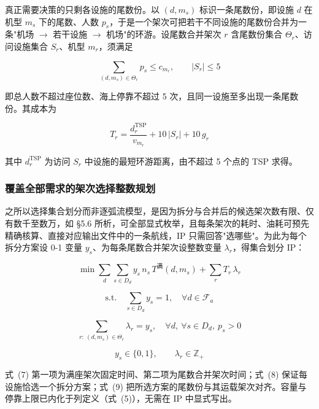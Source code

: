 \documentclass[zihao=-4,a4paper]{ctexart}
\begin{document}
真正需要决策的只剩各设施的尾数份。以 $(d,m_s)$ 标识一条尾数份，即设施 $d$ 在机型 $m_s$ 下的尾数、人数 $p_s$，于是一个架次可把若干不同设施的尾数份合并为一条"机场 $\to$ 若干设施 $\to$ 机场"的环游。设尾数合并架次 $r$ 含尾数份集合 $\Theta_r$、访问设施集合 $S_r$、机型 $m_r$，须满足

\begin{equation}
  \sum_{(d,m_s)\in\Theta_r} p_s \le c_{m_r},\qquad |S_r|\le 5
\end{equation}

即总人数不超过座位数、海上停靠不超过 5 次，且同一设施至多出现一条尾数份。其成本为

\begin{equation}
  T_r=\frac{d_r^{\text{TSP}}}{v_{m_r}}+10\,|S_r|+10\,g_r
\end{equation}

其中 $d_r^{\text{TSP}}$ 为访问 $S_r$ 中设施的最短环游距离，由不超过 5 个点的 TSP 求得。

\subsubsection{覆盖全部需求的架次选择整数规划}

之所以选择集合划分而非逐弧流模型，是因为拆分与合并后的候选架次数有限、仅有数千至数万，如 §5.6 所析，可全部显式枚举，且每条架次的耗时、油耗可预先精确核算、直接对应输出文件中的一条航线，IP 只需回答"选哪些"。为此为每个拆分方案设 0-1 变量 $y_s$、为每条尾数合并架次设整数变量 $\lambda_r$，得集合划分 IP：

\begin{equation}
  \min \sum_{d}\sum_{s\in D_d} y_s\,n_s\,T^{\text{满}}(d,m_s)+\sum_{r}T_r\,\lambda_r
\end{equation}

\begin{equation}
  \text{s.t.}\quad \sum_{s\in D_d} y_s=1,\quad \forall d\in\mathcal{F}_a
\end{equation}

\begin{equation}
  \sum_{r:\ (d,m_s)\in\Theta_r}\lambda_r = y_s,\quad \forall d,\ \forall s\in D_d,\ p_s>0
\end{equation}

\begin{equation}
  y_s\in\{0,1\},\qquad \lambda_r\in\mathbb{Z}_+
\end{equation}

式~(7) 第一项为满座架次固定时间、第二项为尾数合并架次时间；式~(8) 保证每设施恰选一个拆分方案；式~(9) 把所选方案的尾数份与其运载架次对齐。容量与停靠上限已内化于列定义（式~(5)），无需在 IP 中显式写出。
\end{document}
